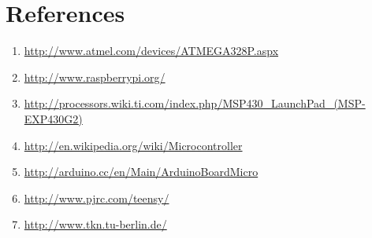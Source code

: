 \documentclass[12pt]{article} %
\begin{document}
\section*{References} %
\begin{enumerate}
\item \url{http://www.atmel.com/devices/ATMEGA328P.aspx}
\item \url{http://www.raspberrypi.org/}
\item \url{http://processors.wiki.ti.com/index.php/MSP430_LaunchPad_(MSP-EXP430G2)}
\item \url{http://en.wikipedia.org/wiki/Microcontroller}
\item \url{http://arduino.cc/en/Main/ArduinoBoardMicro}
\item \url{http://www.pjrc.com/teensy/}
\item \url{http://www.tkn.tu-berlin.de/}
\end{enumerate}
\end{document}
